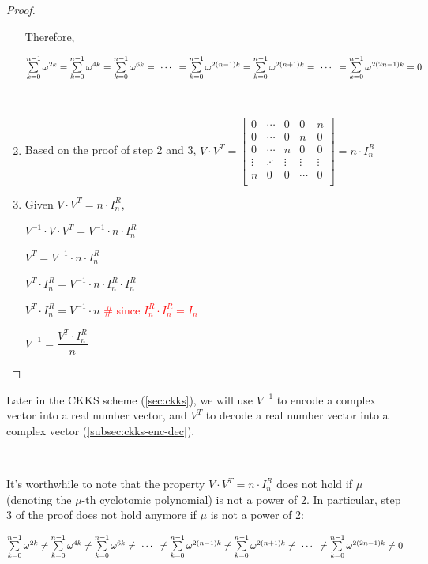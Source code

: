 \begin{proof}
\begin{enumerate}
Therefore,

$\sum\limits_{k=0}^{n-1} \omega^{2k} = \sum\limits_{k=0}^{n-1} \omega^{4k} = \sum\limits_{k=0}^{n-1} \omega^{6k} = \text{ } \text{$\cdots$} \text{ } = \sum\limits_{k=0}^{n-1} \omega^{2(n-1)k} = \sum\limits_{k=0}^{n-1} \omega^{2(n+1)k} = \text{ } \text{$\cdots$} \text{ } = \sum\limits_{k=0}^{n-1} \omega^{2(2n-1)k} = 0$

$ $

\item Based on the proof of step 2 and 3, $V \cdot V^T = 
\begin{bmatrix}
0 & \cdots & 0 & 0 & n\\
0 & \cdots & 0 & n & 0\\
0 & \cdots & n & 0 & 0\\
\vdots & \iddots & \vdots & \vdots & \vdots \\
n & 0 & 0 & \cdots & 0\\
\end{bmatrix} = n \cdot I_n^R$

\item Given $V \cdot V^T = n \cdot I_n^R$, 

$V^{-1} \cdot V \cdot V^T = V^{-1} \cdot n \cdot I_n^R$

$V^T = V^{-1} \cdot n \cdot I_n^R$

$V^T \cdot I_n^R = V^{-1} \cdot n \cdot I_n^R  \cdot I_n^R$

$V^T \cdot I_n^R = V^{-1} \cdot n$ \textcolor{red}{\text{ } \# since $I_n^R  \cdot I_n^R = I_n$}

$V^{-1} = \dfrac{V^T \cdot I_n^R}{n}$

\end{enumerate}
\end{proof}

Later in the CKKS scheme (\autoref{sec:ckks}), we will use $V^{-1}$ to encode a complex vector into a real number vector, and $V^T$ to decode a real number vector into a complex vector (\autoref{subsec:ckks-enc-dec}).

$ $

 It's worthwhile to note that the property $V\cdot V^T = n\cdot I_n^R$ does not hold if $\mu$ (denoting the $\mu$-th cyclotomic polynomial) is not a power of 2. In particular, step 3 of the proof does not hold anymore if $\mu$ is not a power of 2:

$\sum\limits_{k=0}^{n-1} \omega^{2k} \neq \sum\limits_{k=0}^{n-1} \omega^{4k} \neq \sum\limits_{k=0}^{n-1} \omega^{6k} \neq \text{ } \text{$\cdots$} \text{ } \neq \sum\limits_{k=0}^{n-1} \omega^{2(n-1)k} \neq \sum\limits_{k=0}^{n-1} \omega^{2(n+1)k} \neq \text{ } \text{$\cdots$} \text{ } \neq \sum\limits_{k=0}^{n-1} \omega^{2(2n-1)k} \neq 0$



